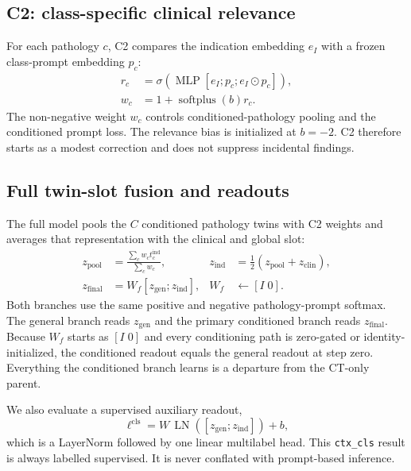 \documentclass[10pt,twocolumn]{article}
\begin{document}
\subsection{C2: class-specific clinical relevance}
For each pathology $c$, C2 compares the indication embedding $e_I$ with a
frozen class-prompt embedding $p_c$:
\begin{align}
r_c &= \sigma\!\left(\operatorname{MLP}
  [e_I;p_c;e_I\odot p_c]\right),\\
w_c &= 1+\operatorname{softplus}(b)r_c.
\end{align}
The non-negative weight $w_c$ controls conditioned-pathology pooling and the
conditioned prompt loss. The relevance bias is initialized at $b=-2$. C2
therefore starts as a modest correction and does not suppress incidental
findings.

\subsection{Full twin-slot fusion and readouts}
The full model pools the $C$ conditioned pathology twins with C2 weights
and averages that representation with the clinical and global slot:
\begin{align}
z_{\mathrm{pool}} &= \frac{\sum_c w_c t_c^{\mathrm{ind}}}{\sum_c w_c}, &
z_{\mathrm{ind}} &= \tfrac12(z_{\mathrm{pool}}+z_{\mathrm{clin}}),\\
z_{\mathrm{final}} &= W_f[z_{\mathrm{gen}};z_{\mathrm{ind}}], &
W_f &\leftarrow [I\;0].
\end{align}
Both branches use the same positive and negative pathology-prompt softmax. The
general branch reads $z_{\mathrm{gen}}$ and the primary conditioned branch
reads $z_{\mathrm{final}}$. Because $W_f$ starts as $[I\;0]$ and every
conditioning path is zero-gated or identity-initialized, the conditioned
readout equals the general readout at step zero. Everything the conditioned
branch learns is a departure from the CT-only parent.

We also evaluate a supervised auxiliary readout,
\begin{equation}
\ell^{\mathrm{cls}} = W\,\operatorname{LN}
([z_{\mathrm{gen}};z_{\mathrm{ind}}])+b,
\end{equation}
which is a LayerNorm followed by one linear multilabel head. This
\texttt{ctx\_cls} result is always labelled supervised. It is never conflated
with prompt-based inference.
\end{document}
